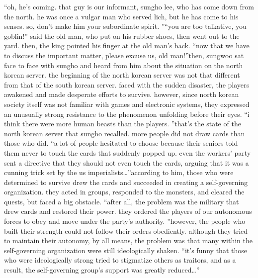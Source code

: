 “oh, he’s coming.
 that guy is our informant, sungho lee, who has come down from the north.
 he was once a vulgar man who served lich, but he has come to his senses.
 so, don’t make him your subordinate spirit.
”“you are too talkative, you goblin!” said the old man, who put on his rubber shoes, then went out to the yard.
then, the king pointed his finger at the old man’s back.
“now that we have to discuss the important matter, please excuse us, old man!”then, sungwoo sat face to face with sungho and heard from him about the situation on the north korean server.
the beginning of the north korean server was not that different from that of the south korean server.
 faced with the sudden disaster, the players awakened and made desperate efforts to survive.
however, since north korean society itself was not familiar with games and electronic systems, they expressed an unusually strong resistance to the phenomenon unfolding before their eyes.
“i think there were more human beasts than the players.
”that’s the state of the north korean server that sungho recalled.
 more people did not draw cards than those who did.
“a lot of people hesitated to choose because their seniors told them never to touch the cards that suddenly popped up.
 even the workers’ party sent a directive that they should not even touch the cards, arguing that it was a cunning trick set by the us imperialists…”according to him, those who were determined to survive drew the cards and succeeded in creating a self-governing organization.
they acted in groups, responded to the monsters, and cleared the quests, but faced a big obstacle.
“after all, the problem was the military that drew cards and restored their power.
 they ordered the players of our autonomous forces to obey and move under the party’s authority.
”however, the people who built their strength could not follow their orders obediently.
although they tried to maintain their autonomy, by all means, the problem was that many within the self-governing organization were still ideologically shaken.
“it’s funny that those who were ideologically strong tried to stigmatize others as traitors, and as a result, the self-governing group’s support was greatly reduced…”

 
